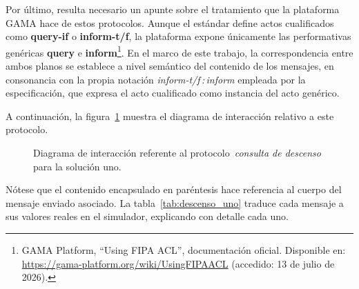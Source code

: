 Por último, resulta necesario un apunte sobre el tratamiento que la plataforma GAMA hace de estos protocolos. Aunque el estándar define actos 
cualificados como \textbf{query-if} o \textbf{inform-t/f}, la plataforma expone únicamente las performativas genéricas \textbf{query} e
\textbf{inform}\footnote{GAMA Platform, \enquote{Using FIPA ACL},
documentación oficial. Disponible en:
\url{https://gama-platform.org/wiki/UsingFIPAACL} (accedido: 13 de julio de
2026).}. En el marco de este trabajo, la correspondencia entre ambos planos se establece a nivel semántico del contenido de los mensajes, 
en consonancia con la propia notación \textit{inform-t/f\,:\,inform} empleada por la especificación, que expresa el acto cualificado como 
instancia del acto genérico.

A continuación, la figura~\ref{fig:descenso_uno} muestra el diagrama de interacción relativo a este protocolo.

\begin{figure}[H]
 \centering
    
\caption{Diagrama de interacción referente al protocolo~\textit{consulta de descenso} para la solución uno.}
\par\vspace{4pt}{\footnotesize Fuente: elaboración propia.}\label{fig:descenso_uno}
\end{figure}


Nótese que el contenido encapsulado en paréntesis hace referencia al cuerpo del mensaje enviado asociado. La tabla~\ref{tab:descenso_uno}
traduce cada mensaje a sus valores reales en el simulador, explicando con detalle cada uno.

